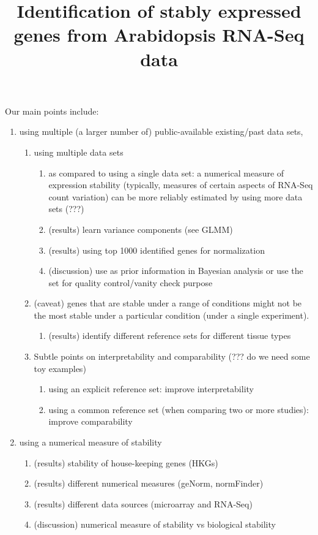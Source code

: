 \documentclass[11pt, a4paper]{article}
\title{Identification of stably expressed genes from Arabidopsis RNA-Seq data}
\date{} %
\begin{document}
Our main points include: 
\begin{enumerate}
    \item using multiple (a larger number of) public-available existing/past data sets, 
	\begin{enumerate}
	    \item
		using multiple data sets 
		\begin{enumerate}
		    \item
			as compared to using a single data set: a numerical
			measure of expression stability (typically, measures
			of certain aspects of RNA-Seq count variation) can be
			more reliably estimated by using more data sets (???)
		    \item
			(results) learn variance components (see GLMM)
		    \item
			(results) using top 1000 identified genes for
			normalization
		    \item
			(discussion) use as prior information in Bayesian analysis or
			use the  set for quality control/vanity check purpose
		\end{enumerate}
	    \item
		(caveat) genes that are stable under a range of conditions
		might not be the most stable under a particular condition
		(under a single experiment).
		\begin{enumerate}
		    \item
			(results) identify different reference sets for different tissue
			types
		\end{enumerate}

	    \item Subtle points on interpretability and comparability (??? do
		we need some toy examples)

		\begin{enumerate}
		    \item
			using an explicit reference set: improve interpretability
		    \item
			using a common reference set (when comparing two or more studies): improve comparability
		\end{enumerate}
	\end{enumerate}

    \item
	using a numerical measure of stability
	\begin{enumerate}
	    \item
		(results) stability of house-keeping genes (HKGs)
	    \item
		(results) different numerical measures (geNorm, normFinder)
	    \item
		(results) different data sources (microarray and RNA-Seq)
	    \item
		(discussion) numerical measure of stability vs biological
		stability 
	\end{enumerate}



\end{enumerate}
\end{document}
